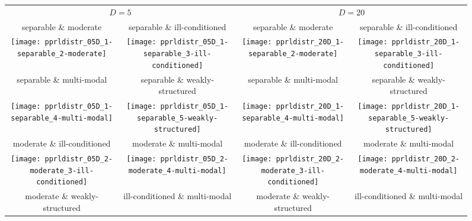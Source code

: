 \documentclass{sig-alternate}
\begin{document}
\begin{figure*}
\begin{tabular}{@{\hspace*{-0.005\textwidth}}c@{\hspace*{-0.025\textwidth}}c@{\hspace*{-0.00\textwidth}}|c@{\hspace*{-0.025\textwidth}}c}
\multicolumn{2}{c}{$D=5$} & \multicolumn{2}{c}{$D=20$}\\[-0.5ex]
\small separable \& moderate & \small separable \& ill-conditioned & \small separable \& moderate & \small separable \& ill-conditioned\\ 
\texttt{[image: pprldistr\_05D\_1-separable\_2-moderate]} &
\texttt{[image: pprldistr\_05D\_1-separable\_3-ill-conditioned]} &
\texttt{[image: pprldistr\_20D\_1-separable\_2-moderate]} &
\texttt{[image: pprldistr\_20D\_1-separable\_3-ill-conditioned]} \\
\small separable \& multi-modal & \small separable \& weakly-structured & \small separable \& multi-modal & \small separable \& weakly-structured\\ 
\texttt{[image: pprldistr\_05D\_1-separable\_4-multi-modal]} &
\texttt{[image: pprldistr\_05D\_1-separable\_5-weakly-structured]} &
\texttt{[image: pprldistr\_20D\_1-separable\_4-multi-modal]} &
\texttt{[image: pprldistr\_20D\_1-separable\_5-weakly-structured]} \\
\small moderate \& ill-conditioned & \small moderate \& multi-modal & \small moderate \& ill-conditioned & \small moderate \& multi-modal\\ 
\texttt{[image: pprldistr\_05D\_2-moderate\_3-ill-conditioned]} &
\texttt{[image: pprldistr\_05D\_2-moderate\_4-multi-modal]} &
\texttt{[image: pprldistr\_20D\_2-moderate\_3-ill-conditioned]} &
\texttt{[image: pprldistr\_20D\_2-moderate\_4-multi-modal]} \\
\small moderate \& weakly-structured & \small ill-conditioned \& multi-modal & \small moderate \& weakly-structured & \small ill-conditioned \& multi-modal\\ 

\end{tabular}
\end{figure*}
\end{document}
